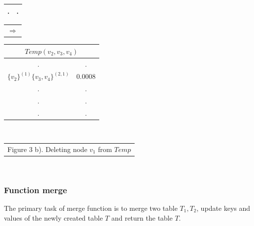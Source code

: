 \documentclass[11pt]{article}
\begin{document}
\begin{table}[!htb]
\begin{minipage}{.4\linewidth}
\begin{tabular}{cc}
                   \multicolumn{1}{|c}{.} & \multicolumn{1}{|c|}{.} \\ \hline        
\end{tabular}
    \end{minipage}%
     \begin{minipage}{.06\linewidth}
        \begin{tabular}{c}
     $ \Rightarrow$\\
        \end{tabular}
    \end{minipage}%
    \begin{minipage}{.3\linewidth}
      \centering
     \begin{tabular}{cc}
\multicolumn{2}{c}{$Temp(v_2,v_3,v_4)$}                           \\ \hline
\multicolumn{1}{|c}{.} & \multicolumn{1}{|c|}{.} \\ \hline
  \multicolumn{1}{|l}{$\{v_2\}^{(1)}\{v_3,v_4\}^{(2,1)}$} & \multicolumn{1}{|l|}{$0.0008$} \\ \hline         
                   \multicolumn{1}{|c}{.} & \multicolumn{1}{|c|}{.} \\ \hline                 
                   \multicolumn{1}{|c}{.} & \multicolumn{1}{|c|}{.} \\ \hline
                   \multicolumn{1}{|c}{.} & \multicolumn{1}{|c|}{.} \\ \hline        
\end{tabular}
    \end{minipage}\\
      \begin{minipage}{1.0\linewidth}
       \centering
        \begin{tabular}{c}
Figure 3 b). Deleting node $v_1$ from $Temp$
        \end{tabular}
    \end{minipage}\\
\end{table}
\subsubsection{Function merge}
The primary task of merge function is to merge two table $T_1, T_2$, update keys and values of the newly created table $T$ and return the table $T$.
\end{document}
